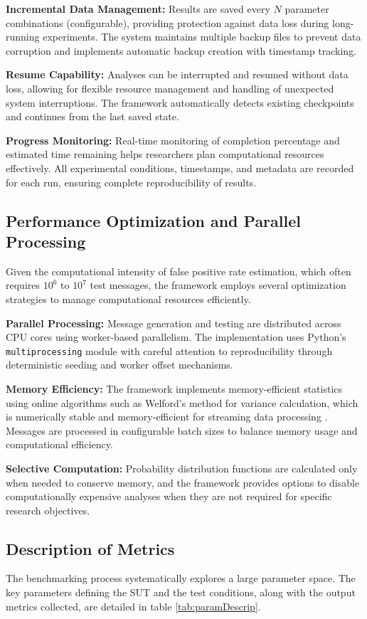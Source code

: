 \documentclass[english,BCOR=4mm,cdfont=false]{tudscrreprt} %
\begin{document}
\textbf{Incremental Data Management:} Results are saved every $N$ parameter combinations (configurable), providing protection against data loss during long-running experiments. The system maintains multiple backup files to prevent data corruption and implements automatic backup creation with timestamp tracking.

\textbf{Resume Capability:} Analyses can be interrupted and resumed without data loss, allowing for flexible resource management and handling of unexpected system interruptions. The framework automatically detects existing checkpoints and continues from the last saved state.

\textbf{Progress Monitoring:} Real-time monitoring of completion percentage and estimated time remaining helps researchers plan computational resources effectively. All experimental conditions, timestamps, and metadata are recorded for each run, ensuring complete reproducibility of results.

\subsection{Performance Optimization and Parallel Processing}
Given the computational intensity of false positive rate estimation, which often requires $10^6$ to $10^7$ test messages, the framework employs several optimization strategies to manage computational resources efficiently.

\textbf{Parallel Processing:} Message generation and testing are distributed across CPU cores using worker-based parallelism. The implementation uses Python's \texttt{multiprocessing} module with careful attention to reproducibility through deterministic seeding and worker offset mechanisms.

\textbf{Memory Efficiency:} The framework implements memory-efficient statistics using online algorithms such as Welford's method for variance calculation, which is numerically stable and memory-efficient for streaming data processing \cite{Welford01081962}. Messages are processed in configurable batch sizes to balance memory usage and computational efficiency.

\textbf{Selective Computation:} Probability distribution functions are calculated only when needed to conserve memory, and the framework provides options to disable computationally expensive analyses when they are not required for specific research objectives.


\subsection{Description of Metrics}
The benchmarking process systematically explores a large parameter space. The key parameters defining the SUT and the test conditions, along with the output metrics collected, are detailed in table \ref{tab:paramDescrip}.
\end{document}
